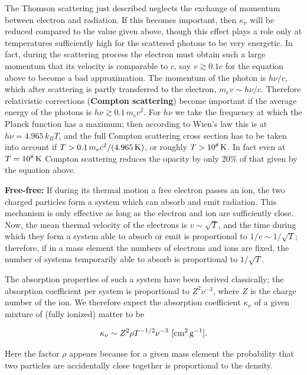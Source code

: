 \documentclass[a4paper,10pt]{article}
\begin{document}
{\noindent}The Thomson scattering just described neglects the exchange of momentum between electron and radiation. If this becomes important, then $\kappa_\nu$ will be reduced compared to the value given above, though this effect plays a role only at temperatures sufficiently high for the scattered photons to be very energetic. In fact, during the scattering process the electron must obtain such a large momentum that its velocity is comparable to $c$, say $v\gtrsim0.1c$ for the equation above to become a bad approximation. The momentum of the photon is $h\nu/c$, which after scattering is partly transferred to the electron, $m_ev\sim h\nu/c$. Therefore relativistic corrections (\textbf{Compton scattering}) become important if the average energy of the photons is $h\nu\gtrsim0.1\,m_ec^2$. For $h\nu$ we take the frequency at which the Planck function has a maximum; then according to Wien's law this is at $h\nu=4.965\,k_BT$, and the full Compton scattering cross section has to be taken into account if $T>0.1\,m_ec^2/(4.965\,{\rm K})$, or roughly $T>10^8\,{\rm K}$. In fact even at $T=10^8\,{\rm K}$ Compton scattering reduces the opacity by only 20\% of that given by the equation above.

{\noindent}\textbf{Free-free:} If during its thermal motion a free electron passes an ion, the two charged particles form a system which can absorb and emit radiation. This mechanism is only effective as long as the electron and ion are sufficiently close. Now, the mean thermal velocity of the electrons is $v\sim\sqrt{T}$, and the time during which they form a system able to absorb or emit is proportional to $1/v\sim1/\sqrt{T}$; therefore, if in a mass element the numbers of electrons and ions are fixed, the number of systems temporarily able to absorb is proportional to $1/\sqrt{T}$.

{\noindent}The absorption properties of such a system have been derived classically; the absorption coefficient per system is proportional to $Z^2\nu^{-3}$, where $Z$ is the charge number of the ion. We therefore expect the absorption coefficient $\kappa_\nu$ of a given mixture of (fully ionized) matter to be

\begin{align*}
    \kappa_\nu \sim Z^2\rho T^{-1/2}\nu^{-3} ~ [{\rm cm^2\,g^{-1}}].
\end{align*}

{\noindent}Here the factor $\rho$ appears because for a given mass element the probability that two particles are accidentally close together is proportional to the density.
\end{document}
